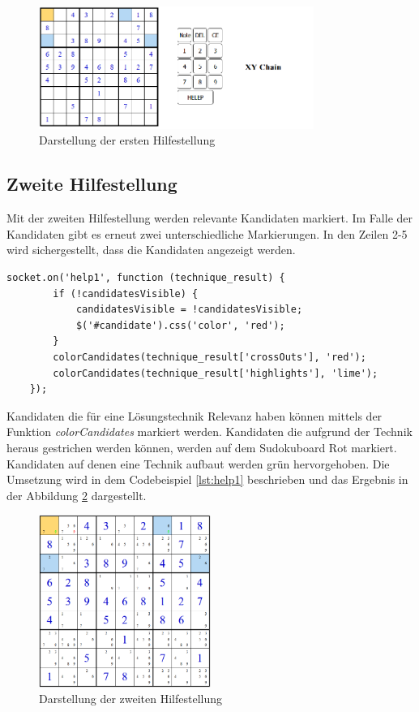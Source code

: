 \begin{figure}[htbp]
	\centering
	\includegraphics[width=0.8\textwidth]{images/Help1.png}
	\caption{Darstellung der ersten Hilfestellung}
	\label{fig:Help1}
\end{figure}

\subsection{Zweite Hilfestellung}
Mit der zweiten Hilfestellung werden relevante Kandidaten markiert. Im Falle der Kandidaten gibt es erneut zwei unterschiedliche Markierungen. In den Zeilen 2-5 wird sichergestellt, dass die Kandidaten angezeigt werden. 

\begin{lstlisting}[caption={Zweite Hilfestellung}, label={lst:help1}]
	socket.on('help1', function (technique_result) {
		if (!candidatesVisible) {
			candidatesVisible = !candidatesVisible;
			$('#candidate').css('color', 'red');
		}
		colorCandidates(technique_result['crossOuts'], 'red');
		colorCandidates(technique_result['highlights'], 'lime');
	});

\end{lstlisting}

Kandidaten die für eine Lösungstechnik Relevanz haben können mittels der Funktion \textit{colorCandidates} markiert werden. Kandidaten die aufgrund der Technik heraus gestrichen werden können, werden auf dem Sudokuboard Rot markiert. Kandidaten auf denen eine Technik aufbaut werden grün hervorgehoben. Die Umsetzung wird in dem Codebeispiel \ref{lst:help1} beschrieben und das Ergebnis in der Abbildung \ref{fig:Help2} dargestellt.

\begin{figure}[htbp]
	\centering
	\includegraphics[width=0.5\textwidth]{images/Help2.png}
	\caption{Darstellung der zweiten Hilfestellung}
	\label{fig:Help2}
\end{figure}

